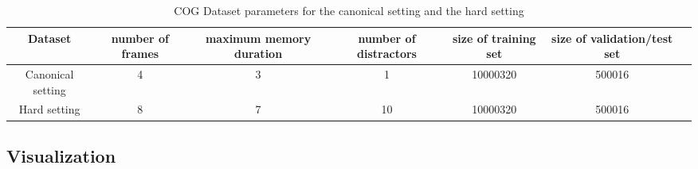 \begin{table}[htb]
\caption{COG Dataset parameters for the canonical setting and the hard setting  }
\centering
\begin{adjustbox}{width=\textwidth}
\begin{tabular}{ccccccc}
	\toprule
	
	Dataset    &  	number of frames  &  	maximum memory duration & number of distractors & size of training set & size of validation/test set    \\ 
	\midrule
	
	Canonical setting & 4 & 3 & 1 & 10000320 & 500016 &   \\
	\midrule
	
	Hard  setting & 8 & 7& 10 & 10000320 & 500016  \\
	\bottomrule	
\end{tabular}
\end{adjustbox}
\label{tab:parameters}
\end{table}



\subsection{Visualization}

